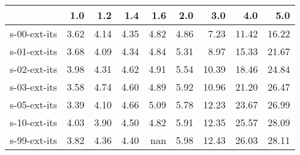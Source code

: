 \begin{tabular}{lrrrrrrrr}
\toprule
{} &  1.0 &  1.2 &  1.4 &  1.6 &  2.0 &   3.0 &   4.0 &   5.0 \\
\midrule
s-00-ext-its & 3.62 & 4.14 & 4.35 & 4.82 & 4.86 &  7.23 & 11.42 & 16.22 \\
s-01-ext-its & 3.68 & 4.09 & 4.34 & 4.84 & 5.31 &  8.97 & 15.33 & 21.67 \\
s-02-ext-its & 3.98 & 4.31 & 4.62 & 4.91 & 5.54 & 10.39 & 18.46 & 24.84 \\
s-03-ext-its & 3.58 & 4.74 & 4.60 & 4.89 & 5.92 & 10.96 & 21.20 & 26.47 \\
s-05-ext-its & 3.39 & 4.10 & 4.66 & 5.09 & 5.78 & 12.23 & 23.67 & 26.99 \\
s-10-ext-its & 4.03 & 3.90 & 4.50 & 4.82 & 5.91 & 12.35 & 25.57 & 28.09 \\
s-99-ext-its & 3.82 & 4.36 & 4.40 &  nan & 5.98 & 12.43 & 26.03 & 28.11 \\
\bottomrule
\end{tabular}
